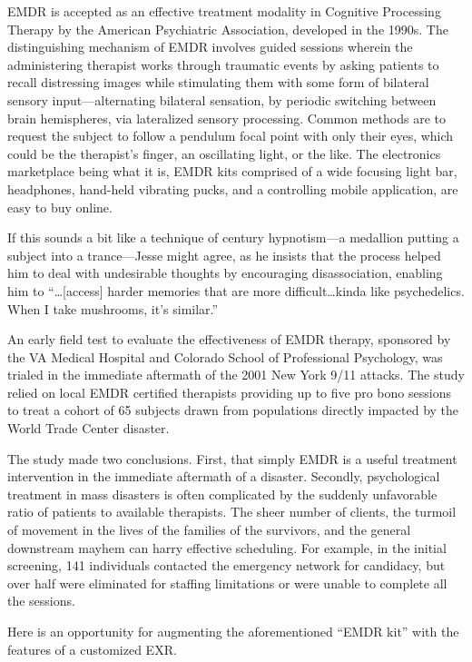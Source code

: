 \documentclass{UIdahoMastersThesis}
\begin{document}
\ac{EMDR} is accepted as an effective treatment modality in Cognitive Processing Therapy by the American Psychiatric Association, developed in the 1990s. The distinguishing mechanism of \ac{EMDR} involves guided sessions wherein the administering therapist works through traumatic events by asking patients to recall distressing images while stimulating them with some form of bilateral sensory input---alternating bilateral sensation, by periodic switching between brain hemispheres, via lateralized sensory processing. Common methods are to request the subject to follow a pendulum focal point with only their eyes, which could be the therapist's finger, an oscillating light, or the like. The electronics marketplace being what it is, \ac{EMDR} kits comprised of a wide focusing light bar, headphones, hand-held vibrating pucks, and a controlling mobile application, are easy to buy online. 

If this sounds a bit like a technique of  century hypnotism---a medallion putting a subject into a trance---Jesse might agree, as he insists that the process helped him to deal with undesirable thoughts by encouraging disassociation, enabling him to \enquote{\ldots[access] harder memories that are more difficult\ldots kinda like psychedelics. When I take mushrooms, it's similar.}

An early field test to evaluate the effectiveness of EMDR therapy, sponsored by the VA Medical Hospital and Colorado School of Professional Psychology, was trialed in the immediate aftermath of the 2001 New York 9/11 attacks. The study relied on local EMDR certified therapists providing up to five pro bono sessions to treat a cohort of 65 subjects drawn from populations directly impacted by the World Trade Center disaster. 

The study made two conclusions. First, that simply EMDR is a useful treatment intervention in the immediate aftermath of a disaster. Secondly, psychological treatment in mass disasters is often complicated by the suddenly unfavorable ratio of patients to available therapists. The sheer number of clients, the turmoil of movement in the lives of the families of the survivors, and the general downstream mayhem can harry effective scheduling. For example, in the initial screening, 141 individuals contacted the emergency network for candidacy, but over half were eliminated for staffing limitations or were unable to complete all the sessions.

Here is an opportunity for augmenting the aforementioned ``EMDR kit'' with the features of a customized EXR.
\end{document}
